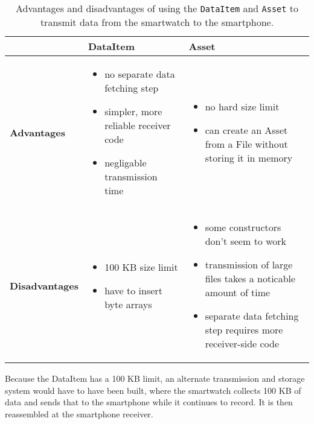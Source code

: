       \begin{table}
        \centering
        {\tabulinesep=1.2mm
        \begin{tabu} to \linewidth { X[2,c,m] | X[3,l,m] | X[3,l,m] | }
          & \textbf{DataItem} & \textbf{Asset} \\
          \hline
          \textbf{Advantages} & 
            \begin{itemize}
              \item no separate data fetching step
              \item simpler, more reliable receiver code
              \item negligable transmission time
            \end{itemize} &
            \begin{itemize}
              \item no hard size limit
              \item can create an Asset from a File without storing it in memory
            \end{itemize} \\
          \hline
          \textbf{Disadvantages} &
            \begin{itemize}
              \item 100 KB size limit
              \item have to insert byte arrays
            \end{itemize} &
            \begin{itemize}
              \item some constructors don't seem to work
              \item transmission of large files takes a noticable amount of time
              \item separate data fetching step requires more receiver-side code
            \end{itemize} \\
          \hline
        \end{tabu}}
        \caption{Advantages and disadvantages of using the \texttt{DataItem} and \texttt{Asset} to transmit data from the smartwatch to the smartphone.}
        \label{tab:dataitem-vs-asset}
      \end{table}
      
      Because the DataItem has a 100 KB limit, an alternate transmission and storage system would have to have been built, where the smartwatch collects 100 KB of data and sends that to the smartphone while it continues to record. It is then reassembled at the smartphone receiver.
      
